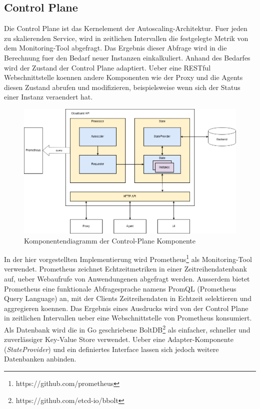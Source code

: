 \documentclass[runningheads]{llncs}
\begin{document}
\subsection{Control Plane} \label{control_plane}

Die Control Plane ist das Kernelement der Autoscaling-Architektur. Fuer jeden zu skalierenden Service, wird in zeitlichen Intervallen die festgelegte Metrik von dem Monitoring-Tool abgefragt. Das Ergebnis dieser Abfrage wird in die Berechnung fuer den Bedarf neuer Instanzen einkalkuliert. Anhand des Bedarfes wird der Zustand der Control Plane adaptiert. Ueber eine RESTful Webschnittstelle koennen andere Komponenten wie der Proxy und die Agents diesen Zustand abrufen und modifizieren, beispielsweise wenn sich der Status einer Instanz veraendert hat.
	
\begin{figure}[h]
	\centering
	\includegraphics[width=1.0\linewidth,scale=1.0]{images/autoscaler.png}
	\caption{Komponentendiagramm der Control-Plane Komponente}
\end{figure}
 
In der hier vorgestellten Implementierung wird Prometheus\footnote{https://github.com/prometheus} als Monitoring-Tool verwendet.  Prometheus zeichnet Echtzeitmetriken in einer Zeitreihendatenbank auf, ueber Webaufrufe von Anwendungenen abgefragt werden. Ausserdem bietet Prometheus eine funktionale Abfragesprache namens PromQL (Prometheus Query Language) an, mit der Clients Zeitreihendaten in Echtzeit selektieren und aggregieren koennen. Das Ergebnis eines Ausdrucks wird von der Control Plane in zeitlichen Intervallen ueber eine Webschnittstelle von Prometheus konsumiert. \\

Als Datenbank wird die in Go geschriebene BoltDB\footnote{https://github.com/etcd-io/bbolt} als einfacher, schneller und zuverlässiger Key-Value Store verwendet. Ueber eine Adapter-Komponente (\textit{StateProvider}) und ein definiertes Interface lassen sich jedoch weitere Datenbanken anbinden.
\end{document}

